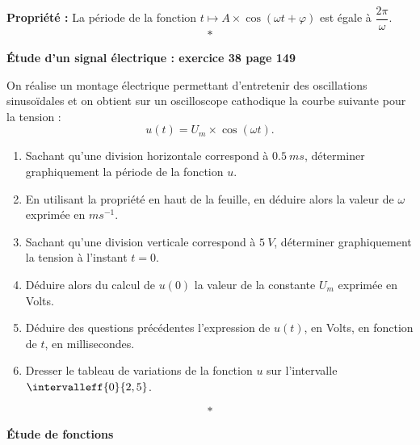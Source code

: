 \documentclass[12pt,openright,twoside,french]{book}
\begin{document}
\small


\textbf{Propriété :} La période de la fonction $t \mapsto A \times \cos(\omega t + \varphi)$ est égale à $\dfrac{2\pi}{\omega}$.\[*\]

\textbf{\'Etude d'un signal électrique : exercice 38 page 149}

On réalise un montage électrique permettant d'entretenir des oscillations sinusoïdales et on obtient sur un oscilloscope cathodique la courbe suivante pour la tension :
\[u(t) = U_m \times \cos(\omega t).\]

\begin{center}
\end{center}

\begin{enumerate}
    \item Sachant qu'une division horizontale correspond à $0.5~ms$, déterminer graphiquement la période de la fonction $u$.
    \item En utilisant la propriété en haut de la feuille, en déduire alors la valeur de $\omega$ exprimée en $ms^{-1}$.
    \item Sachant qu'une division verticale correspond à $5~V$, déterminer graphiquement la tension à l'instant $t = 0$.
    \item Déduire alors du calcul de $u(0)$ la valeur de la constante $U_m$ exprimée en Volts.
    \item Déduire des questions précédentes l'expression de $u(t)$, en Volts, en fonction de $t$, en millisecondes.
    \item Dresser le tableau de variations de la fonction $u$ sur l'intervalle $\intervalleff{0}{2,5}$.
\end{enumerate}\[*\]

\textbf{\'Etude de fonctions}
\end{document}
